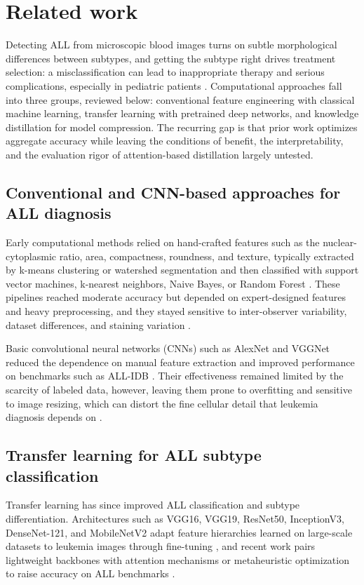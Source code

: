 \documentclass[preprint,review,12pt]{elsarticle}
\begin{document}
\section{Related work}
Detecting ALL from microscopic blood images turns on subtle
morphological differences between subtypes, and getting the subtype right
drives treatment selection: a misclassification can lead to inappropriate
therapy and serious complications, especially in pediatric patients
\cite{ref1,ref6,ref16,ref17}. Computational approaches fall into three
groups, reviewed below: conventional feature engineering with classical
machine learning, transfer learning with pretrained deep networks, and
knowledge distillation for model compression. The recurring gap is that
prior work optimizes aggregate accuracy while leaving the conditions of
benefit, the interpretability, and the evaluation rigor of
attention-based distillation largely untested.

\subsection{Conventional and CNN-based approaches for ALL diagnosis}

Early computational methods relied on hand-crafted features such as the
nuclear-cytoplasmic ratio, area, compactness, roundness, and texture,
typically extracted by k-means clustering or watershed segmentation and
then classified with support vector machines, k-nearest neighbors, Naive
Bayes, or Random Forest \cite{ref18,ref19}. These pipelines reached
moderate accuracy but depended on expert-designed features and heavy
preprocessing, and they stayed sensitive to inter-observer variability,
dataset differences, and staining variation \cite{ref20,ref21}.

Basic convolutional neural networks (CNNs) such as AlexNet and VGGNet
reduced the dependence on manual feature extraction and improved
performance on benchmarks such as ALL-IDB \cite{ref4}. Their
effectiveness remained limited by the scarcity of labeled data, however,
leaving them prone to overfitting and sensitive to image resizing, which
can distort the fine cellular detail that leukemia diagnosis depends on
\cite{ref18,ref22}.

\subsection{Transfer learning for ALL subtype classification}

Transfer learning has since improved ALL classification and subtype
differentiation. Architectures such as VGG16, VGG19, ResNet50,
InceptionV3, DenseNet-121, and MobileNetV2 \cite{ref4,ref21,ref22} adapt
feature hierarchies learned on large-scale datasets to leukemia images
through fine-tuning \cite{ref23,ref24}, and recent work pairs lightweight
backbones with attention mechanisms or metaheuristic optimization to
raise accuracy on ALL benchmarks \cite{ref25,ref26}.
\end{document}
